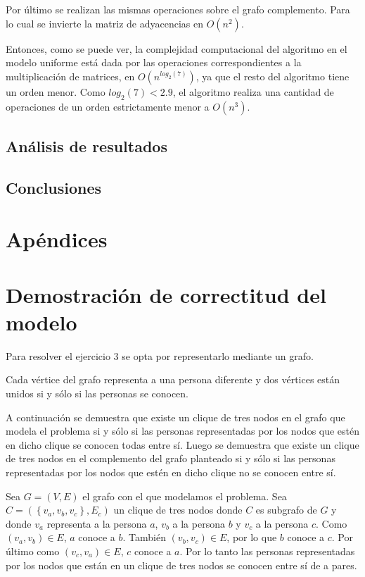 \documentclass[a4paper, 12pt]{article}
\begin{document}
Por último se realizan las mismas operaciones sobre el grafo complemento. Para lo cual se invierte la matriz de adyacencias en $O \left( n^2 \right)$.


Entonces, como se puede ver, la complejidad computacional del algoritmo en el modelo uniforme está dada por las operaciones correspondientes a la multiplicación de matrices, en $O \left( n^{log_2\left(7\right)} \right) $, ya que el resto del algoritmo tiene un orden menor. Como $log_2\left(7\right) < 2.9 $, el algoritmo realiza una cantidad de operaciones de un orden estrictamente menor a $O\left( n^3\right) $.




\subsection*{Análisis de resultados}
\subsection*{Conclusiones}

\section*{Apéndices}
\section{Demostración de correctitud del modelo}\label{dem_clique}

Para resolver el ejercicio 3 se opta por representarlo mediante un grafo.

Cada vértice del grafo representa a una persona diferente y dos vértices están unidos si y sólo si las personas se conocen.


A continuación se demuestra que existe un clique de tres nodos en el grafo que modela el problema si y sólo si las personas representadas por los nodos que estén en dicho clique se conocen todas entre sí. Luego se demuestra que existe un clique de tres nodos en el complemento del grafo planteado si y sólo si las personas representadas por los nodos que estén en dicho clique no se conocen entre sí.

Sea $G = \left( V, E \right)$ el grafo con el que modelamos el problema. Sea $ C = \left( \left\lbrace v_a, v_b,v_c \right\rbrace, E_c \right) $ un clique de tres nodos donde $C$ es subgrafo de $G$ y donde $v_a$ representa a la persona $a$, $v_b$ a la persona $b$ y $v_c$ a la persona $c$. Como $\left( v_a, v_b \right) \in E $, $a$ conoce a $b$. También $\left(v_b,v_c\right) \in E$, por lo que $b$ conoce a $c$. Por último como $\left(v_c,v_a\right) \in E$, $c$ conoce a $a$. Por lo tanto las personas representadas por los nodos que están en un clique de tres nodos se conocen entre sí de a pares.
\end{document}
